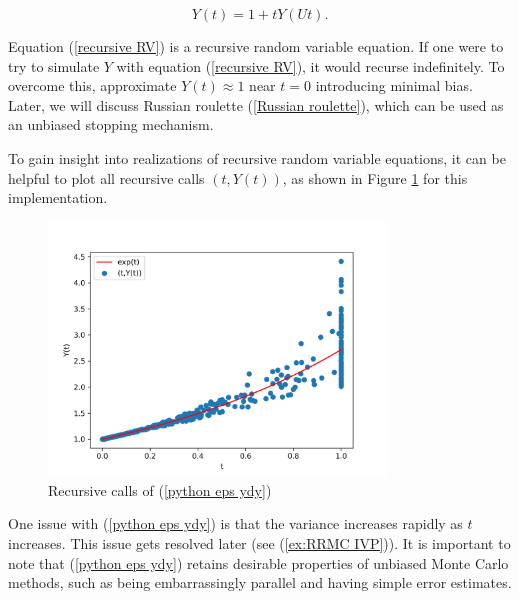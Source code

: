 \documentclass[a4paper,12pt]{article}
\begin{document}
\begin{equation} \label{recursive RV}
    Y(t) = 1 + t  Y(Ut).
\end{equation}

Equation (\ref{recursive RV}) is a recursive random variable
equation. If one were to try to simulate $Y$ with equation (\ref{recursive RV}),
it would recurse indefinitely.
To overcome this, approximate
$Y(t) \approx 1$ near $t = 0$ introducing minimal bias.
Later, we will discuss Russian roulette (\ref{Russian roulette}),
which can be used as an unbiased stopping mechanism.

\vspace*{0.2cm}

\begin{pythonn} \label{python eps ydy}
    To gain insight into realizations of recursive random variable equations,
    it can be helpful to plot
    all recursive calls $(t,Y(t))$, as shown in Figure \ref{fig:intro example}
    for this implementation.

    \begin{figure}[h!]
        \centering
        \includegraphics[width=0.8\textwidth]{plots/intro example.png}
        \caption{Recursive calls of (\ref{python eps ydy})}
        \label{fig:intro example}
    \end{figure}
\end{pythonn}

One issue with (\ref{python eps ydy}) is that the variance
increases rapidly as $t$ increases. This issue gets resolved
later (see (\ref{ex:RRMC IVP})). It is important to note that
(\ref{python eps ydy}) retains desirable properties of unbiased Monte
Carlo methods, such as being embarrassingly parallel and having simple
error estimates.
\end{document}
